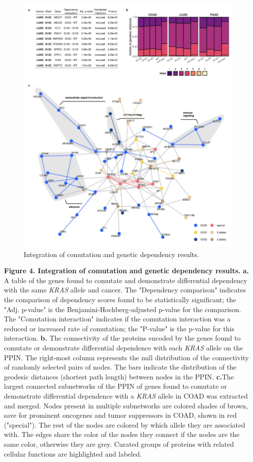 \documentclass[english, 10pt, letterpaper]{article}
\newcommand{\KRAS}{\emph{KRAS}}
\begin{document}
\begin{figure}[h!]
\centering
\includegraphics[width=180mm]{figures/Fig_4.jpeg}
\caption{Integration of comutation and genetic dependency results.}
\label{fig:results-integration-main}
\end{figure}

\newpage
\noindent \textbf{Figure 4. Integration of comutation and genetic dependency results.}
\textbf{a.} A table of the genes found to comutate and demonstrate differential dependency with the same \KRAS{} allele and cancer. The "Dependency comparison" indicates the comparison of dependency scores found to be statistically significant; the "Adj. p-value" is the Benjamini-Hochberg-adjusted p-value for the comparison. The "Comutation interaction" indicates if the comutation interaction was a reduced or increased rate of comutation; the "P-value" is the p-value for this interaction.
\textbf{b.} The connectivity of the proteins encoded by the genes found to comutate or demonstrate differential dependence with each \KRAS{} allele on the PPIN. The right-most column represents the null distribution of the connectivity of randomly selected pairs of nodes. The bars indicate the distribution of the geodesic distances (shortest path length) between nodes in the PPIN.
\textbf{c.}The largest connected subnetworks of the PPIN of genes found to comutate or demonstrate differential dependence with a \KRAS{} allele in COAD was extracted and merged. Nodes present in multiple subnetworks are colored shades of brown, save for prominent oncogenes and tumor suppressors in COAD, shown in red ("special"). The rest of the nodes are colored by which allele they are associated with. The edges share the color of the nodes they connect if the nodes are the same color, otherwise they are grey. Curated groups of proteins with related cellular functions are highlighted and labeled.
\newpage
\end{document}
